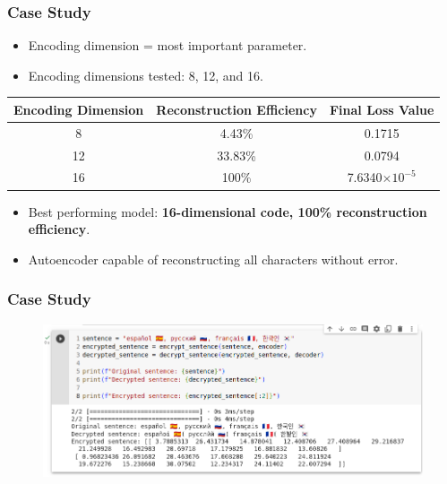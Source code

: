 \documentclass{beamer}
\begin{document}
\begin{frame}
    \frametitle{Case Study}
    \begin{itemize}
        \item Encoding dimension = most important parameter.
        \item Encoding dimensions tested: 8, 12, and 16.
    \end{itemize}
    \begin{table}[h]
        \centering
        \begin{tabular}{|c|c|c|}
            \hline
            Encoding Dimension & Reconstruction Efficiency & Final Loss Value      \\
            \hline
            8                  & 4.43\%                    & 0.1715                \\
            12                 & 33.83\%                   & 0.0794                \\
            16                 & 100\%                     & 7.6340$\times10^{-5}$ \\
            \hline
        \end{tabular}
    \end{table}
    \begin{itemize}
        \item Best performing model: \textbf{16-dimensional code, 100\% reconstruction efficiency}.
        \item Autoencoder capable of reconstructing all characters without error.
    \end{itemize}
\end{frame}

\begin{frame}
    \frametitle{Case Study}
    \begin{figure}[h]
        \centering
        \includegraphics[width=\textwidth]{img/unicode.png}
    \end{figure}
\end{frame}
\end{document}

